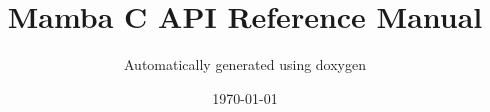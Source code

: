 \documentclass[a4paper,10pt,oneside]{article}
\title{Mamba C API Reference Manual}
\author{Automatically generated using doxygen}
\date\today
\begin{document}
\mambaCover
\mambaContent
\end{document}
